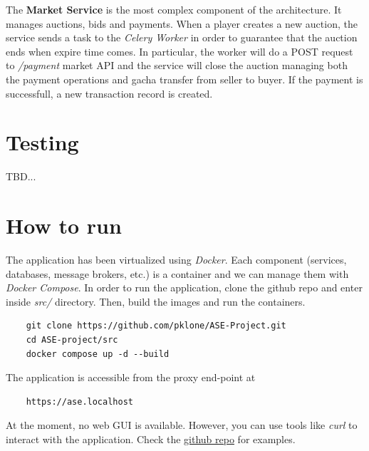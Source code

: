 \documentclass{article}
\begin{document}
The \textbf{Market Service} is the most complex component of the architecture. It manages auctions, bids and payments. When a player creates a new auction, the service sends a task to the \emph{Celery Worker} in order to guarantee that the auction ends when expire time comes. In particular, the worker will do a POST request to \emph{/payment} market API and the service will close the auction managing both the payment operations and gacha transfer from seller to buyer. If the payment is successfull, a new transaction record is created.

\section{Testing}
TBD...

\newpage
\section{How to run}
The application has been virtualized using \emph{Docker}. Each component (services, databases, message brokers, etc.) is a container and we can manage them with \emph{Docker Compose}. In order to run the application, clone the github repo and enter inside \emph{src/} directory. Then, build the images and run the containers.
\begin{verbatim}
    git clone https://github.com/pklone/ASE-Project.git
    cd ASE-project/src
    docker compose up -d --build
\end{verbatim}
The application is accessible from the proxy end-point at
\begin{verbatim}
    https://ase.localhost
\end{verbatim}
At the moment, no web GUI is available. However, you can use tools like \emph{curl} to interact with the application. Check the \href{https://github.com/pklone/ASE-Project/test/README.md}{github repo} for examples.
\end{document}

